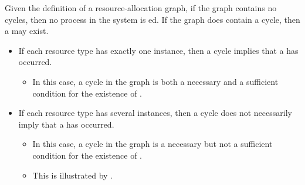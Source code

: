 Given the definition of a resource-allocation graph, if the graph contains no cycles, then no process in the system is ed.
If the graph does contain a cycle, then a  may exist.
\begin{itemize}[noitemsep]
\item If each resource type has exactly one instance, then a cycle implies that a  has occurred.
  \begin{itemize}[noitemsep]
  \item In this case, a cycle in the graph is both a necessary and a sufficient condition for the existence of .
  \end{itemize}
\item If each resource type has several instances, then a cycle does not necessarily imply that a  has occurred.
  \begin{itemize}[noitemsep]
  \item In this case, a cycle in the graph is a necessary but not a sufficient condition for the existence of .
  \item This is illustrated by .
  \end{itemize}
\end{itemize}


